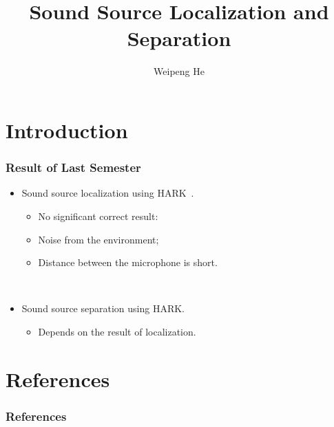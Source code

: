 \documentclass{beamer}
\title{Sound Source Localization and Separation}
\author{Weipeng He}
\begin{document}
\frame{\titlepage}


\section{Introduction}
\begin{frame}
  \frametitle{Result of Last Semester}
  
  \begin{itemize}
    \item Sound source localization using HARK~\cite{rabiner_fundamentals_1993}.
      \begin{itemize}
        \item No significant correct result:
        \item Noise from the environment;
        \item Distance between the microphone is short.
      \end{itemize}
    ~

    \item Sound source separation using HARK.
      \begin{itemize}
        \item Depends on the result of localization.
      \end{itemize}
  \end{itemize}
\end{frame}


\section*{References}
\begin{frame}[allowframebreaks]
  \frametitle{References}
  {\footnotesize
  
    
  }
\end{frame}
\end{document}

